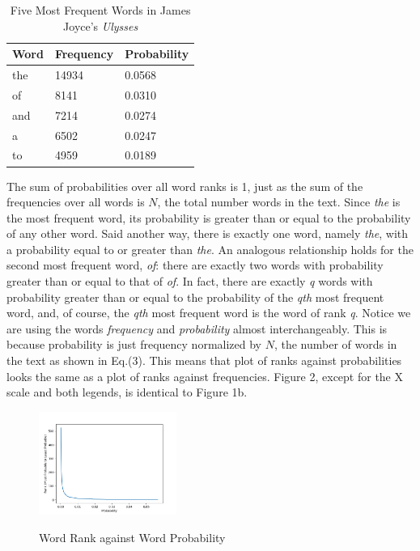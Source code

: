 \documentclass[12pt]{article}
\begin{document}
\begin{table}[h!]
\begin{center}
 \begin{tabular}{||l l l||}
 \hline
 Word &  Frequency  & Probability \\
 \hline
    the & 14934& 0.0568    \\
    of & 8141 & 0.0310   \\
    and & 7214 & 0.0274    \\
    a & 6502 & 0.0247    \\
    to & 4959 & 0.0189    \\
  \hline
\end{tabular} 
\caption{Five Most Frequent Words in James Joyce's \emph{Ulysses}}
\end{center}
\end{table}

The sum of probabilities over all word ranks is 1, just as the sum of the frequencies over all words is $N$, the total number words in the text.  Since \emph{the} is the most frequent word, its probability is greater than or equal to the probability of any other word.  Said another way, there is exactly one word, namely \emph{the}, with a probability equal to or greater than \emph{the}.  An analogous relationship holds for the second most frequent word, \emph{of}: there are exactly two words with probability greater than or equal to that of \emph{of}.  In fact, there are exactly \emph{q} words with probability greater than or equal to the probability of the \emph{qth} most frequent word, and, of course, the \emph{qth} most frequent word is the word of rank \emph{q}.  Notice we are using the words \emph{frequency} and \emph{probability} almost interchangeably.  This is because probability is just frequency normalized by $N$, the number of words in the text as shown in Eq.(3).   This means that plot of ranks against probabilities looks the same as a plot of ranks against frequencies.  Figure 2, except for the X scale and both legends, is identical to Figure 1b.  

\begin{figure}[h!]
    \centering
    \includegraphics[width=0.4\textwidth]{ulyssesRXP.png}\\
    \caption{Word Rank against Word Probability}%
\end{figure}
\end{document}

